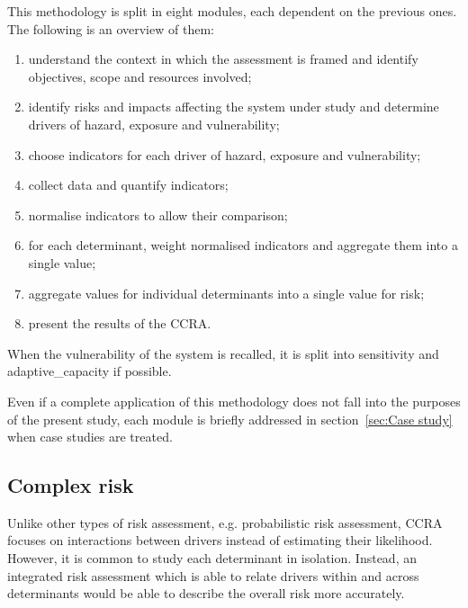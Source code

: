 This methodology is split in eight modules, each dependent on the previous ones. The following is an overview of them:
\begin{enumerate}
  \item understand the context in which the assessment is framed and identify objectives, scope and resources involved;\cite[39-53]{2017GIZTheVulnerability}
  \item \label{itm:module_2} identify \glspl{risk} and \glspl{impact} affecting the system under study and determine \glspl{driver} of \gls{hazard}, \gls{exposure} and \gls{vulnerability};\cite[26-41]{2017GIZRiskSupplement}
  \item \label{itm:module_3} choose \glspl{indicator} for each \gls{driver} of \gls{hazard}, \gls{exposure} and \gls{vulnerability};\cite[73-84]{2017GIZTheVulnerability}
  \item \label{itm:module_4} collect data and quantify \glspl{indicator};\cite[87-103]{2017GIZTheVulnerability}
  \item \label{itm:module_5} normalise \glspl{indicator} to allow their comparison;\cite[105-119]{2017GIZTheVulnerability}
  \item \label{itm:module_6} for each \gls{determinant}, weight normalised \glspl{indicator} and aggregate them into a single value;\cite[121-131]{2017GIZTheVulnerability}
  \item \label{itm:module_7} aggregate values for individual \glspl{determinant} into a single value for \gls{risk};\cite[133-141]{2017GIZTheVulnerability}
  \item \label{itm:module_8} present the results of the \gls{CCRA}.\cite[143-154]{2017GIZTheVulnerability}
\end{enumerate}
When the \gls{vulnerability} of the system is recalled, it is split into \gls{sensitivity} and \gls{adaptive_capacity} if possible.

Even if a complete application of this methodology does not fall into the purposes of the present study, each module is briefly addressed in section~\ref{sec:Case study} when case studies are treated.



\subsection{Complex risk}
\label{sec:Complex risk}
Unlike other types of risk assessment, e.g. probabilistic risk assessment, \gls{CCRA} focuses on interactions between \glspl{driver} instead of estimating their likelihood.\cite[20-21]{2017GIZRiskSupplement} However, it is common to study each \gls{determinant} in isolation. Instead, an integrated risk assessment which is able to relate \glspl{driver} within and across \glspl{determinant} would be able to describe the overall \gls{risk} more accurately.\cite[145-147]{2023IPCCClimateChange}

